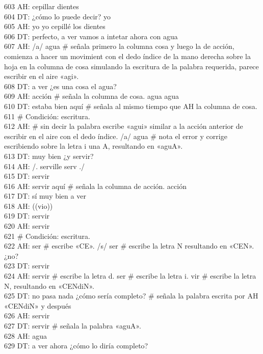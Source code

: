 603 AH: cepillar dientes\\
604 DT: ¿cómo lo puede decir? yo\\
605 AH: yo yo cepillé los dientes\\
606 DT: perfecto, a ver vamos a intetar ahora con agua\\
607 AH: /a/ agua \# señala primero la columna cosa y luego la de acción, comienza a hacer un movimient con el dedo índice de la mano derecha sobre la hoja en la columna de cosa simulando la escritura de la palabra requerida, parece escribir en el aire «agi».\\
608 DT: a ver ¿es una cosa el agua?\\
609 AH: acción \# señala la columna de cosa. agua agua\\
610 DT: estaba bien aquí \# señala al mismo tiempo que AH la columna de cosa.\\
611 \# Condición: escritura.\\
612 AH: \# sin decir la palabra escribe «agui» similar a la acción anterior de escribir en el aire con el dedo índice. /a/ agua \# nota el error y corrige escribiendo sobre la letra i una A, resultando en «aguA».\\
613 DT: muy bien ¿y servir?\\
614 AH: /. serville serv ./ \\
615 DT: servir\\
616 AH: servir aquí \# señala la columna de acción. acción\\
617 DT: sí muy bien a ver\\
618 AH: ((vio))\\
619 DT: servir\\
620 AH: servir\\
621 \# Condición: escritura.\\
622 AH: ser \# escribe «CE». /s/ ser \# escribe la letra N resultando en «CEN». ¿no?\\
623 DT: servir\\
624 AH: servir \# escribe la letra d. ser \# escribe la letra i. vir \# escribe la letra N, resultando en «CENdiN».\\
625 DT: no pasa nada ¿cómo sería completo? \# señala la palabra escrita por AH «CENdiN» y después\\
626 AH: servir\\
627 DT: servir \# señala la palabra «aguA».\\
628 AH: agua\\
629 DT: a ver ahora ¿cómo lo diría completo?\\
